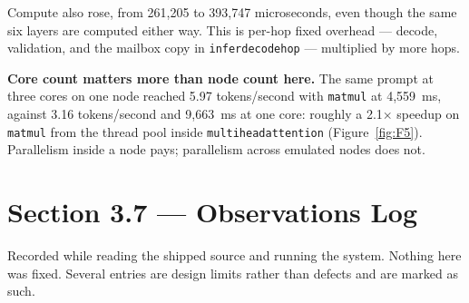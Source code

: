 \documentclass[11pt]{article}
\renewcommand{\_}{\origunderscore\allowbreak}
\begin{document}
Compute also rose, from 261{,}205 to 393{,}747 microseconds, even though the same six layers are computed either way. This is per-hop fixed overhead --- decode, validation, and the mailbox copy in \texttt{infer\_decode\_hop} --- multiplied by more hops.

\textbf{Core count matters more than node count here.} The same prompt at three cores on one node reached 5.97 tokens/second with \texttt{matmul} at 4{,}559~ms, against 3.16 tokens/second and 9{,}663~ms at one core: roughly a 2.1$\times$ speedup on \texttt{matmul} from the thread pool inside \texttt{multihead\_attention} (Figure~\ref{fig:F5}). Parallelism inside a node pays; parallelism across emulated nodes does not.

\section*{Section 3.7 --- Observations Log}

Recorded while reading the shipped source and running the system. Nothing here was fixed. Several entries are design limits rather than defects and are marked as such.
\end{document}
